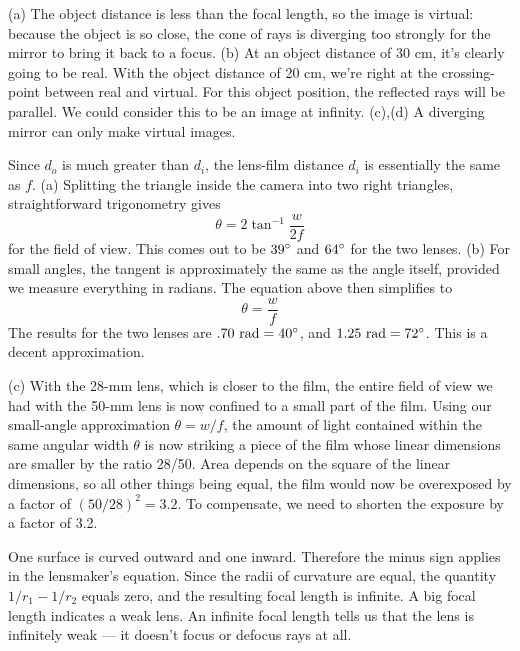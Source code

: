 (a) The object distance is less than the focal length, so the
image is virtual: because the object is so close, the cone of rays
is diverging too strongly for the mirror to bring it back to a focus.
(b) At an object distance of 30 cm, it's clearly going to be real.
With the object distance of 20 cm, we're right at the crossing-point between
real and virtual. For this object position, the reflected rays will be
parallel. We could consider this to be an image at infinity.
(c),(d) A diverging mirror can only make virtual images.

Since $d_o$ is much greater than $d_i$, the lens-film
distance $d_i$ is essentially the same as $f$. (a) Splitting
the triangle inside the camera into two right triangles,
straightforward trigonometry gives
\begin{equation*}
		 \theta =  2 \tan^{-1}\frac{w}{2f}
\end{equation*}
 for the field of view. This comes out to be $39\mspace{0mu}^\circ$ and
$64\mspace{0mu}^\circ$ for the two lenses. (b) For small angles, the
tangent is approximately the same as the angle itself,
provided we measure everything in radians. The equation
above then simplifies to
\begin{equation*}
		 \theta  =  \frac{w}{f}
\end{equation*}
The results for the two lenses are $.70\ \text{rad}=40\degunit$, and
$1.25\ \text{rad}=72\degunit$. This is a decent approximation.

(c) With the 28-mm lens, which is closer to the film, the
entire field of view we had with the 50-mm lens is now
confined to a small part of the film. Using our small-angle
approximation $\theta =w/f$, the amount of light contained
within the same angular width $\theta $ is now striking a
piece of the film whose linear dimensions are smaller by the
ratio 28/50. Area depends on the square of the linear
dimensions, so all other things being equal, the film would
now be overexposed by a factor of $(50/28)^2=3.2$. To
compensate, we need to shorten the exposure by a factor of 3.2.

One surface is curved outward and one inward. Therefore the minus sign
applies in the lensmaker's equation. Since the radii of curvature are
equal, the quantity $1/r_1-1/r_2$ equals zero, and the resulting focal
length is infinite. A big focal length indicates a weak lens. An infinite
focal length tells us that the lens is infinitely weak --- it doesn't
focus or defocus rays at all.
